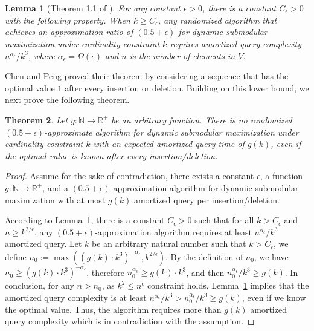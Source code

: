 \documentclass[11pt]{article}
\newtheorem{theorem}{Theorem}
\newtheorem{lemma}[theorem]{Lemma}
\begin{document}
\begin{lemma}[Theorem 1.1 of \cite{DBLP:journals/corr/abs-2111-03198}]
\label{lem:chen&peng:klogk}
For any constant $\epsilon>0$, there is a constant $C_{\epsilon}>0$ with the following property. 
 When $k \ge C_{\epsilon}$, any randomized algorithm that achieves an approximation ratio of 
 $(0.5+\epsilon)$ for dynamic submodular maximization under cardinality constraint $k$ 
requires amortized query complexity $n^{\alpha_{\epsilon}}/k^3$, where
$\alpha_{\epsilon} = \tilde{\Omega}(\epsilon)$ and $n$ is the number of elements in $V$. 
\end{lemma}

Chen and Peng proved their theorem by considering a sequence that has the optimal value $1$ after every insertion or deletion. 
Building on this lower bound, we next prove the following theorem. 

\begin{theorem}
\label{thm:lowerbound:general}
Let $g: \mathbb{N} \to \mathbb{R}^+$ be an arbitrary function.
There is no randomized $(0.5+\epsilon)$-approximate algorithm for dynamic submodular maximization under cardinality constraint $k$ 
with an expected amortized query time of $g(k)$, 
even if the optimal value is known after every insertion/deletion.
\end{theorem}



\begin{proof}
Assume for the sake of contradiction, 
there exists a constant $\epsilon$, a function $g: \mathbb{N} \to \mathbb{R}^+$, and a $(0.5+\epsilon)$-approximation algorithm for dynamic submodular maximization with at most $g(k)$ amortized query per insertion/deletion.

According to Lemma~\ref{lem:chen&peng:klogk}, there is a constant $C_{\epsilon}>0$ such that for all $k>C_{\epsilon}$ and $n \geq k^{2/\epsilon}$, any $(0.5+\epsilon)$-approximation algorithm requires at least $n^{\alpha_{\epsilon}}/k^3$ amortized query. 
Let $k$ be an arbitrary natural number such that $k>C_{\epsilon}$, 
we define $n_{0} := \max((g(k)\cdot k^3)^{-\alpha_{\epsilon}}, k^{{2}/{\epsilon}})$. 
By the definition of $n_0$, we have $n_0 \ge (g(k)\cdot k^3)^{-\alpha_{\epsilon}}$, therefore $n_0^{\alpha_{\epsilon}} \ge g(k)\cdot k^3$, and then $n_{0}^{\alpha_{\epsilon}}/k^3 \ge g(k)$.
In conclusion, for any $n>n_{0}$, as $k^2 \le n^{\epsilon}$ constraint holds, Lemma~\ref{lem:chen&peng:klogk} implies that
the amortized query complexity is at least
$n^{\alpha_{\epsilon}}/k^3 > n_{0}^{\alpha_{\epsilon}}/k^3 \ge g(k)$, even if we know the optimal value.
Thus, the algorithm requires more than $g(k)$ amortized query complexity which is in contradiction with the assumption.

\end{proof}
\end{document}
